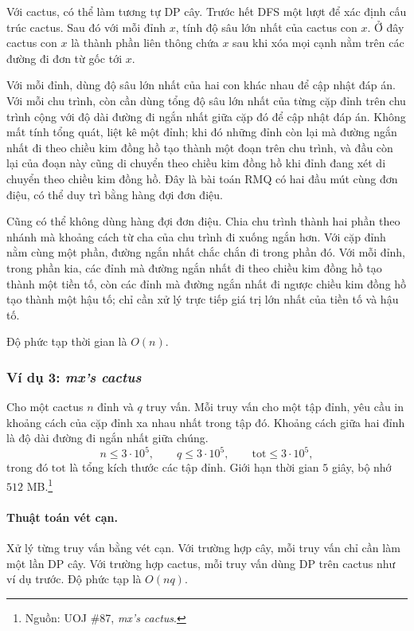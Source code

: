 \documentclass[11pt]{article}
\begin{document}
Với cactus, có thể làm tương tự DP cây. Trước hết DFS một lượt để xác định cấu
trúc cactus. Sau đó với mỗi đỉnh \(x\), tính độ sâu lớn nhất của cactus con
\(x\). Ở đây cactus con \(x\) là thành phần liên thông chứa \(x\) sau khi xóa
mọi cạnh nằm trên các đường đi đơn từ gốc tới \(x\).

Với mỗi đỉnh, dùng độ sâu lớn nhất của hai con khác nhau để cập nhật đáp án.
Với mỗi chu trình, còn cần dùng tổng độ sâu lớn nhất của từng cặp đỉnh trên chu
trình cộng với độ dài đường đi ngắn nhất giữa cặp đó để cập nhật đáp án. Không
mất tính tổng quát, liệt kê một đỉnh; khi đó những đỉnh còn lại mà đường ngắn
nhất đi theo chiều kim đồng hồ tạo thành một đoạn trên chu trình, và đầu còn
lại của đoạn này cũng di chuyển theo chiều kim đồng hồ khi đỉnh đang xét di
chuyển theo chiều kim đồng hồ. Đây là bài toán RMQ có hai đầu mút cùng đơn
điệu, có thể duy trì bằng hàng đợi đơn điệu.

Cũng có thể không dùng hàng đợi đơn điệu. Chia chu trình thành hai phần theo
nhánh mà khoảng cách từ cha của chu trình đi xuống ngắn hơn. Với cặp đỉnh nằm
cùng một phần, đường ngắn nhất chắc chắn đi trong phần đó. Với mỗi đỉnh, trong
phần kia, các đỉnh mà đường ngắn nhất đi theo chiều kim đồng hồ tạo thành một
tiền tố, còn các đỉnh mà đường ngắn nhất đi ngược chiều kim đồng hồ tạo thành
một hậu tố; chỉ cần xử lý trực tiếp giá trị lớn nhất của tiền tố và hậu tố.

Độ phức tạp thời gian là \(O(n)\).

\subsubsection{\texorpdfstring{Ví dụ 3: \emph{mx's cactus}}{Ví dụ 3: mx's cactus}}

Cho một cactus \(n\) đỉnh và \(q\) truy vấn. Mỗi truy vấn cho một tập đỉnh, yêu
cầu in khoảng cách của cặp đỉnh xa nhau nhất trong tập đó. Khoảng cách giữa hai
đỉnh là độ dài đường đi ngắn nhất giữa chúng.
\[
  n\le 3\cdot 10^5,\qquad q\le 3\cdot 10^5,\qquad
  \mathrm{tot}\le 3\cdot 10^5,
\]
trong đó \(\mathrm{tot}\) là tổng kích thước các tập đỉnh. Giới hạn thời gian
\(5\) giây, bộ nhớ \(512\) MB.\footnote{Nguồn: UOJ \#87, \emph{mx's cactus}.}

\paragraph{Thuật toán vét cạn.}
Xử lý từng truy vấn bằng vét cạn. Với trường hợp cây, mỗi truy vấn chỉ cần làm
một lần DP cây. Với trường hợp cactus, mỗi truy vấn dùng DP trên cactus như ví
dụ trước. Độ phức tạp là \(O(nq)\).
\end{document}
